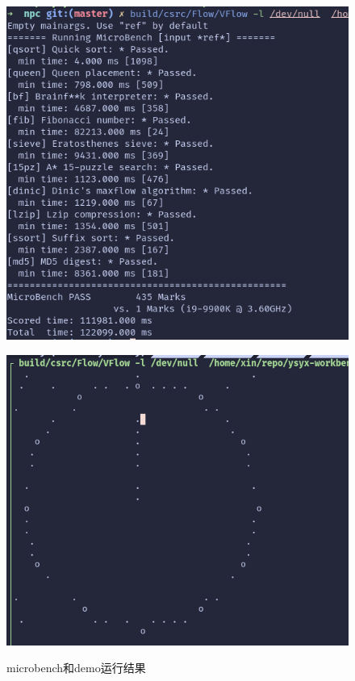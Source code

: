 \begin{figure}
\centering

\begin{minipage}[t]{0.45\textwidth}
    \centering
    \includegraphics[width=\textwidth]{resources/test-bench.png}
    \label{fig:test-bench}
\end{minipage}
\begin{minipage}[t]{0.45\textwidth}
    \centering
    \includegraphics[width=\textwidth]{resources/test-clock.png}
    \label{fig:2-machines-bm}
\end{minipage}
\caption{microbench和demo运行结果}
\end{figure}

